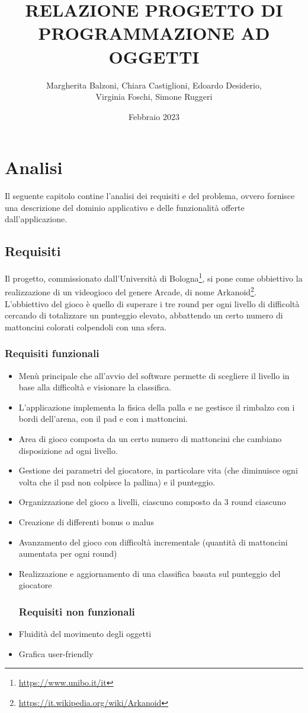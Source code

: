 \documentclass[a4paper,12pt]{report}
\title{RELAZIONE PROGETTO DI PROGRAMMAZIONE AD OGGETTI}
\author{Margherita Balzoni, Chiara Castiglioni, Edoardo Desiderio, \\Virginia Foschi, Simone Ruggeri}
\date{Febbraio 2023}
\begin{document}
\maketitle
\titlepage
\tableofcontents
\newpage

\chapter{Analisi}
Il seguente capitolo contine l'analisi dei requisiti e del problema, ovvero fornisce una descrizione del dominio applicativo e delle funzionalità offerte dall'applicazione.
\section{Requisiti}
Il progetto, commissionato dall'Università di Bologna\footnote{\url{https://www.unibo.it/it}}, si pone come obbiettivo la realizzazione di un videogioco del genere Arcade, di nome Arkanoid\footnote{\url{https://it.wikipedia.org/wiki/Arkanoid}}.\\L'obbiettivo del gioco è quello di superare i tre round per ogni livello di difficoltà cercando di totalizzare un punteggio elevato, abbattendo un certo numero di mattoncini colorati colpendoli con una sfera.
\\
\subsection*{Requisiti funzionali}
\begin{itemize}
    \item Menù principale che all'avvio del software permette di scegliere il livello in base alla difficoltà e visionare la classifica.
    \item L’applicazione implementa la fisica della palla e ne gestisce il rimbalzo con i bordi dell’arena, con il pad e con i mattoncini.
    \item Area di gioco composta da un certo numero di mattoncini che cambiano disposizione ad ogni livello.
    \item Gestione dei parametri del giocatore, in particolare vita (che diminuisce ogni volta che il pad non colpisce la pallina) e il punteggio.
    \item Organizzazione del gioco a livelli, ciascuno composto da 3 round ciascuno
    \item Creazione di differenti bonus o malus
    \item Avanzamento del gioco con difficoltà incrementale (quantità di mattoncini aumentata per ogni round)
    \item Realizzazione e aggiornamento di una classifica basata sul punteggio del giocatore
\subsection*{Requisiti non funzionali}
    \item Fluidità del movimento degli oggetti
    \item Grafica user-friendly
\end{itemize}
\end{document}
